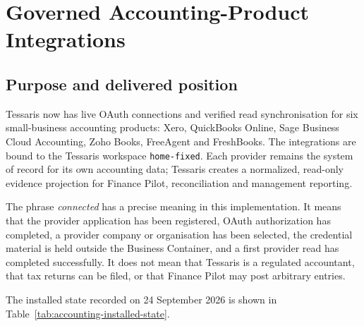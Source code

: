 
\section{Governed Accounting-Product Integrations}
\label{sec:accounting-provider-integrations}

\subsection{Purpose and delivered position}

Tessaris now has live OAuth connections and verified read synchronisation for
six small-business accounting products: Xero, QuickBooks Online, Sage Business
Cloud Accounting, Zoho Books, FreeAgent and FreshBooks.  The integrations are
bound to the Tessaris workspace \texttt{home-fixed}.  Each provider remains the
system of record for its own accounting data; Tessaris creates a normalized,
read-only evidence projection for Finance Pilot, reconciliation and management
reporting.

The phrase \emph{connected} has a precise meaning in this implementation.  It
means that the provider application has been registered, OAuth authorization
has completed, a provider company or organisation has been selected, the
credential material is held outside the Business Container, and a first
provider read has completed successfully.  It does not mean that Tessaris is a
regulated accountant, that tax returns can be filed, or that Finance Pilot may
post arbitrary entries.

The installed state recorded on 24 September 2026 is shown in
Table~\ref{tab:accounting-installed-state}.

